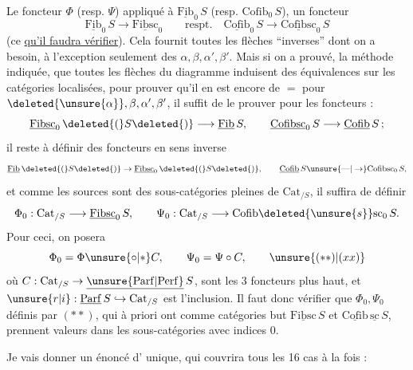 Le foncteur $\Phi$ (resp. $\Psi$) appliqué à $\underline{\mathrm{Fib}}_0\,S$
(resp. $\mathrm{Cofib}_0\,S$),   un foncteur
\[
\underline{\mathrm{Fib}}_0\,S\longrightarrow\underline{\mathrm{Fibsc}}_0
\qquad\text{respt.}\quad
\underline{\mathrm{Cofib}}_0\,S\longrightarrow\underline{\mathrm{Cofibsc}}_0\,S
\tag*{$(*)$}
\]
(ce \uline{qu'il faudra vérifier}). Cela fournit toutes
les flèches ``inverses'' dont on a besoin, à l'exception seulement des $\alpha,\beta,\alpha',\beta'$. Mais si on a
prouvé,  la méthode indiquée, que toutes les
flèches du diagramme induisent des équivalences sur les catégories localisées, pour prouver
qu'il en est encore de $=$ pour $\deleted{\unsure{\alpha}},\beta,\alpha',\beta'$, il
suffit de le prouver pour les  foncteurs :
\[
\underline{\mathrm{Fibsc}}_0\,\deleted{(}S\deleted{)}\longrightarrow\underline{\mathrm{Fib}}\,S,\qquad
\underline{\mathrm{Cofibsc}}_0\,S\longrightarrow\underline{\mathrm{Cofib}}\,S\,;
\]
 il reste à définir des foncteurs en sens
inverse
\[
\underline{\mathrm{Fib}}\,\deleted{(}S\deleted{)}\to\underline{\mathrm{Fibsc}}_0\,\deleted{(}S\deleted{)},\qquad
\underline{\mathrm{Cofib}}\,S\unsure{\text{---}|\to}\mathrm{Cofibsc}_0\,S,
\]
et comme les sources sont des sous-catégories
pleines de $\mathrm{Cat}_{/S}$, il suffira de définir
\[
\Phi_0:\mathrm{Cat}_{/S}\longrightarrow\underline{\mathrm{Fibsc}}_0\,S,\qquad
\Psi_0:\mathrm{Cat}_{/S}\longrightarrow\mathrm{Cofib}\deleted{\unsure{s}}\mathrm{sc}_0\,S.
\]
Pour ceci, on posera
\[
\Phi_0=\Phi\unsure{\circ|*}C,\qquad\Psi_0=\Psi\circ C,\tag*{$\unsure{(**)|(xx)}$}
\]
où $C:\mathrm{Cat}_{/S}\to\underline{\unsure{\mathrm{Parf}|\mathrm{Perf}}}\,S$,
 sont les 3 foncteurs   plus haut, et $\unsure{r|i}:\underline{\mathrm{Parf}}\,S\hookrightarrow\mathrm{Cat}_{/S}$ est l'inclusion.
Il faut donc vérifier que $\Phi_0,\Psi_0$ définis
par $(**)$, qui à priori  ont comme catégories but $\underline{\mathrm{Fibsc}}\,S$ et $\underline{\mathrm{Cofib}}\,\underline{\mathrm{sc}}\,S$, prennent 
valeurs dans les sous-catégories avec indices $0$.

Je vais donner un énoncé d'
unique, qui couvrira  tous les  16 cas à la
fois :

